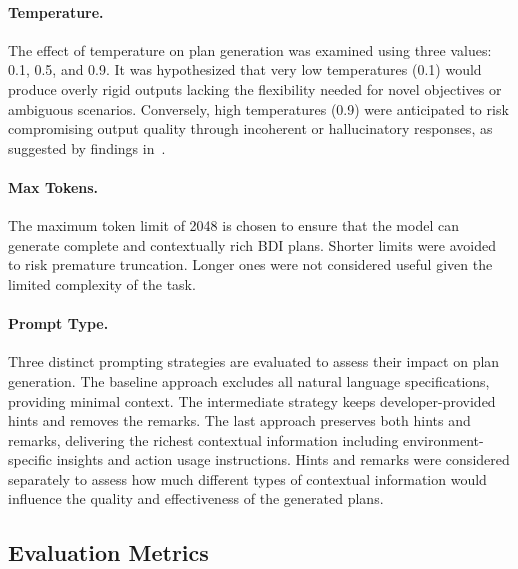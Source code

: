 \documentclass[12pt,a4paper,openright,twoside]{book}
\begin{document}
\paragraph{Temperature.}  The effect of temperature on plan generation was examined using three values: 0.1, 0.5, and 0.9. 
%
It was hypothesized that very low temperatures (0.1) would produce overly rigid outputs lacking the flexibility needed for novel objectives or ambiguous scenarios.
%
Conversely, high temperatures (0.9) were anticipated to risk compromising output quality through incoherent or hallucinatory responses, as suggested by findings in~\cite{holtzmanCuriousCaseNeural2020}.

\paragraph{Max Tokens.} The maximum token limit of 2048 is chosen to ensure that the model can generate complete and contextually rich \ac{BDI} plans.
%
Shorter limits were avoided to risk premature truncation. 
%
Longer ones were not considered useful given the limited complexity of the task.

\paragraph{Prompt Type.} Three distinct prompting strategies are evaluated to assess their impact on plan generation. 
%
The baseline approach excludes all natural language specifications, providing minimal context.
%
The intermediate strategy keeps developer-provided hints and removes the remarks.
%
The last approach preserves both hints and remarks, delivering the richest contextual information including environment-specific insights and action usage instructions. 
%
Hints and remarks were considered separately to assess how much different types of contextual information would influence the quality and effectiveness of the generated plans.

\subsection{Evaluation Metrics}\label{sec:metrics}
\end{document}
